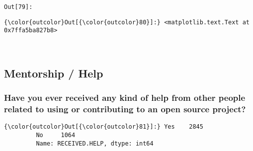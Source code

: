 \documentclass[11pt]{article}
\begin{document}
    

\texttt{\color{outcolor}Out[{\color{outcolor}79}]:}
    

    


            \begin{Verbatim}[commandchars=\\\{\}]
{\color{outcolor}Out[{\color{outcolor}80}]:} <matplotlib.text.Text at 0x7ffa5ba827b8>
\end{Verbatim}
        
    \begin{center}
    \end{center}
    { \hspace*{\fill} \\}
    
    \subsection{Mentorship / Help}\label{mentorship-help}

    \subsubsection{Have you ever received any kind of help from other people
related to using or contributing to an open source
project?}\label{have-you-ever-received-any-kind-of-help-from-other-people-related-to-using-or-contributing-to-an-open-source-project}


            \begin{Verbatim}[commandchars=\\\{\}]
{\color{outcolor}Out[{\color{outcolor}81}]:} Yes    2845
         No     1064
         Name: RECEIVED.HELP, dtype: int64
\end{Verbatim}
        
\end{document}
